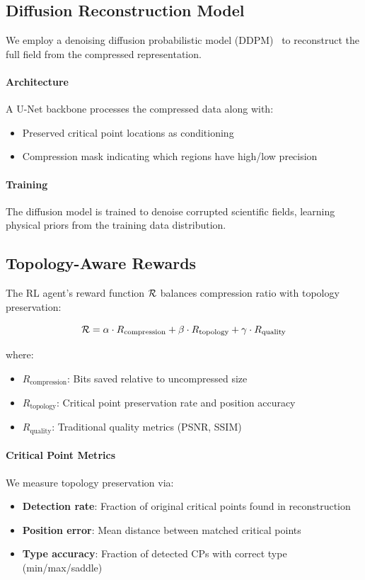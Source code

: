 \subsection{Diffusion Reconstruction Model}

We employ a denoising diffusion probabilistic model (DDPM)~\cite{ddpm2020} to reconstruct the full field from the compressed representation.

\paragraph{Architecture}
A U-Net backbone processes the compressed data along with:
\begin{itemize}
    \item Preserved critical point locations as conditioning
    \item Compression mask indicating which regions have high/low precision
\end{itemize}

\paragraph{Training}
The diffusion model is trained to denoise corrupted scientific fields, learning physical priors from the training data distribution.

\subsection{Topology-Aware Rewards}

The RL agent's reward function $\mathcal{R}$ balances compression ratio with topology preservation:

\begin{equation}
    \mathcal{R} = \alpha \cdot R_{\text{compression}} + \beta \cdot R_{\text{topology}} + \gamma \cdot R_{\text{quality}}
\end{equation}

where:
\begin{itemize}
    \item $R_{\text{compression}}$: Bits saved relative to uncompressed size
    \item $R_{\text{topology}}$: Critical point preservation rate and position accuracy
    \item $R_{\text{quality}}$: Traditional quality metrics (PSNR, SSIM)
\end{itemize}

\paragraph{Critical Point Metrics}
We measure topology preservation via:
\begin{itemize}
    \item \textbf{Detection rate}: Fraction of original critical points found in reconstruction
    \item \textbf{Position error}: Mean distance between matched critical points
    \item \textbf{Type accuracy}: Fraction of detected CPs with correct type (min/max/saddle)
\end{itemize}

